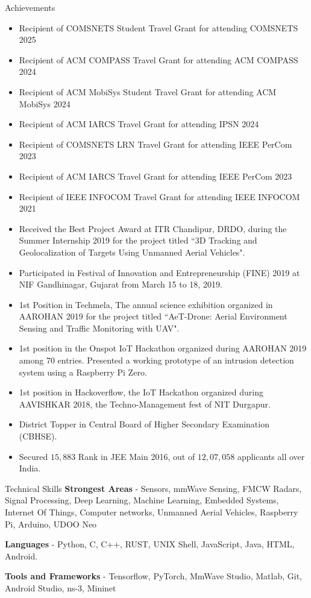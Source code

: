 \documentclass{resume} %
\begin{document}
	
	\begin{rSection}{Achievements} 
		\begin{itemize}
			\item Recipient of COMSNETS Student Travel Grant for attending COMSNETS 2025
			\item Recipient of ACM COMPASS Travel Grant for attending ACM COMPASS 2024
			\item Recipient of ACM MobiSys Student Travel Grant for attending ACM MobiSys 2024
			\item Recipient of ACM IARCS Travel Grant for attending IPSN 2024
			\item Recipient of COMSNETS LRN Travel Grant for attending IEEE PerCom 2023
			\item Recipient of ACM IARCS Travel Grant for attending IEEE PerCom 2023
			\item Recipient of IEEE INFOCOM Travel Grant for attending IEEE INFOCOM 2021
			\item Received the Best Project Award at ITR Chandipur, DRDO, during the Summer Internship 2019 for the project titled ``3D Tracking and Geolocalization of Targets Using Unmanned Aerial Vehicles".
			\item Participated in Festival of Innovation and Entrepreneurship (FINE) 2019 at NIF Gandhinagar, Gujarat from March 15 to 18, 2019.
			\item 1st Position in Techmela, The annual science exhibition organized in AAROHAN 2019 for the project titled ``AeT-Drone: Aerial Environment Sensing and Traffic Monitoring with UAV".
			\item 1st position in the Onspot IoT Hackathon organized during AAROHAN 2019 among 70 entries. Presented a working prototype of an intrusion detection system using a Raspberry Pi Zero.
			\item 1st position in Hackoverflow, the IoT Hackathon organized during AAVISHKAR 2018, the Techno-Management fest of NIT Durgapur.
			\item District Topper in Central Board of Higher Secondary Examination (CBHSE).
			\item Secured $15,883$ Rank in JEE Main 2016, out of $12,07,058$
			applicants all over India.
		\end{itemize}
	\end{rSection}
	\begin{rSection}{Technical Skills}
		\textbf{Strongest Areas} - Sensors, mmWave Sensing, FMCW Radars, Signal Processing, Deep Learning, Machine Learning, Embedded Systems, Internet Of Things, Computer networks, Unmanned Aerial Vehicles, Raspberry Pi, Arduino, UDOO Neo
		
		\textbf{Languages} - Python, C, C++, RUST, UNIX Shell, JavaScript, Java, HTML, Android.
		
		\textbf{Tools and Frameworks} - Tensorflow, PyTorch, MmWave Studio, Matlab, Git, Android Studio, ns-3, Mininet
		
	\end{rSection}
	
\end{document}
